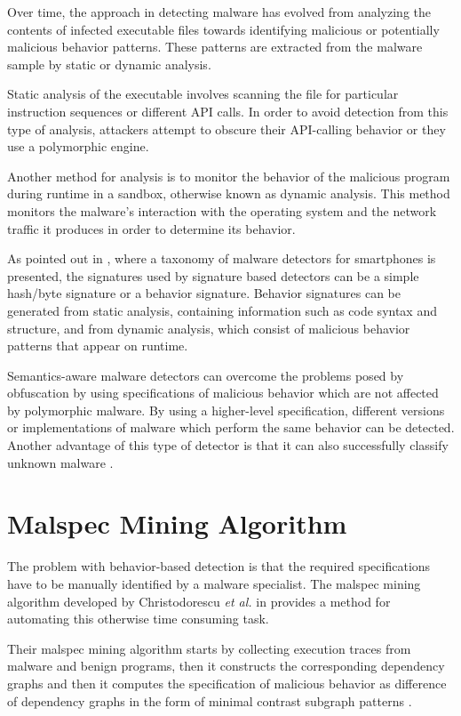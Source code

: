 Over time, the approach in detecting malware has evolved from analyzing the contents of infected executable files towards identifying malicious or potentially malicious behavior patterns. These patterns are extracted from the malware sample by static or dynamic analysis.

Static analysis of the executable involves scanning the file for particular instruction sequences or different API calls. In order to avoid detection from this type of analysis, attackers attempt to obscure their API-calling behavior or they use a polymorphic engine.

Another method for analysis is to monitor the behavior of the malicious program during runtime in a sandbox, otherwise known as dynamic analysis. This method monitors the malware's interaction with the operating system and the network traffic it produces in order to determine its behavior.

As pointed out in \cite{smartphone-malware-detection}, where a taxonomy of malware detectors for smartphones is presented, the signatures used by signature based detectors can be a simple hash/byte signature or a behavior signature. Behavior signatures can be generated from static analysis, containing information such as code syntax and structure, and from dynamic analysis, which consist of malicious behavior patterns that appear on runtime.

Semantics-aware malware detectors can overcome the problems posed by obfuscation by using specifications of malicious behavior which are not affected by polymorphic malware. By using a higher-level specification, different versions or implementations of malware which perform the same behavior can be detected. Another advantage of this type of detector is that it can also successfully classify unknown malware \cite{semantics-based-detection}.

\section{Malspec Mining Algorithm}
\label{sec:malspec-alg}

The problem with behavior-based detection is that the required specifications have to be manually identified by a malware specialist. The malspec mining algorithm developed by Christodorescu \textit{et al.} in \cite{mining-specifications} provides a method for automating this otherwise time consuming task. 

Their malspec mining algorithm starts by collecting execution traces from malware and benign programs, then it constructs the corresponding dependency graphs and then it computes the specification of malicious behavior as difference of dependency graphs in the form of minimal contrast subgraph patterns \cite{minimal-contrast-subgraph}.

